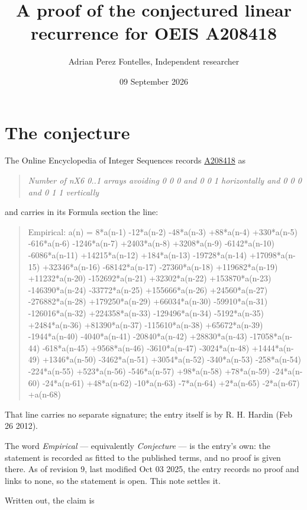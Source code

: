 \documentclass[11pt]{article}
\title{A proof of the conjectured linear recurrence for OEIS A208418}
\author{Adrian Perez Fontelles, Independent researcher}
\date{09 September 2026}
\theoremstyle{definition}
\begin{document}
\maketitle
\section{The conjecture}

The Online Encyclopedia of Integer Sequences records \href{https://oeis.org/A208418}{A208418} as

\begin{quote}\itshape Number of nX6 0..1 arrays avoiding 0 0 0 and 0 0 1 horizontally and 0 0 0 and 0 1 1 vertically\end{quote}

and carries in its Formula section the line:

\begin{quote}\ttfamily Empirical: a(n) = 8*a(n-1) -12*a(n-2) -48*a(n-3) +88*a(n-4) +330*a(n-5) -616*a(n-6) -1246*a(n-7) +2403*a(n-8) +3208*a(n-9) -6142*a(n-10) -6086*a(n-11) +14215*a(n-12) +184*a(n-13) -19728*a(n-14) +17098*a(n-15) +32346*a(n-16) -68142*a(n-17) -27360*a(n-18) +119682*a(n-19) +11232*a(n-20) -152692*a(n-21) +32302*a(n-22) +153870*a(n-23) -146390*a(n-24) -33772*a(n-25) +155666*a(n-26) +24560*a(n-27) -276882*a(n-28) +179250*a(n-29) +66034*a(n-30) -59910*a(n-31) -126016*a(n-32) +224358*a(n-33) -129496*a(n-34) -5192*a(n-35) +2484*a(n-36) +81390*a(n-37) -115610*a(n-38) +65672*a(n-39) -1944*a(n-40) -4040*a(n-41) -20840*a(n-42) +28830*a(n-43) -17058*a(n-44) -618*a(n-45) +9568*a(n-46) -3610*a(n-47) -3024*a(n-48) +1444*a(n-49) +1346*a(n-50) -3462*a(n-51) +3054*a(n-52) -340*a(n-53) -258*a(n-54) -224*a(n-55) +523*a(n-56) -546*a(n-57) +98*a(n-58) +78*a(n-59) -24*a(n-60) -24*a(n-61) +48*a(n-62) -10*a(n-63) -7*a(n-64) +2*a(n-65) -2*a(n-67) +a(n-68)\end{quote}

That line carries no separate signature; the entry itself is by R. H. Hardin (Feb 26 2012).

The word {\itshape Empirical} --- equivalently {\itshape Conjecture} --- is the entry's own: the statement is recorded as fitted to the published terms, and no proof is given there. As of revision 9, last modified Oct 03 2025, the entry records no proof and links to none, so the statement is open. This note settles it.

Written out, the claim is
\end{document}
